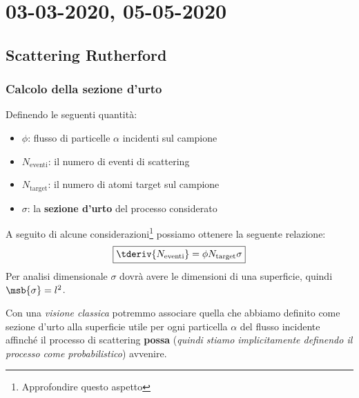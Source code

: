 \chapter{03-03-2020, 05-05-2020}
\section{Scattering Rutherford}
\subsection{Calcolo della sezione d'urto}
Definendo le seguenti quantità:
\begin{itemize}
  \item $\phi$: flusso di particelle $\alpha$ incidenti sul campione
  \item $N_{\text{eventi}}$: il numero di eventi di scattering
  \item $N_{\text{target}}$: il numero di atomi target sul campione
  \item $\sigma$: la \textbf{sezione d'urto} del processo considerato
\end{itemize}
A seguito di alcune considerazioni\footnote{Approfondire questo aspetto}
possiamo ottenere la seguente relazione:
\begin{equation}
  \boxed{\tderiv{N_{\text{eventi}}} = \phi N_{\text{target}} \sigma}
\end{equation}
Per analisi dimensionale $\sigma$ dovrà avere le dimensioni di una superficie,
quindi $\msb{\sigma} = l^2$.\par Con una \textit{visione classica} potremmo
associare quella che abbiamo definito come sezione d'urto alla superficie utile
per ogni particella $\alpha$ del flusso incidente affinché il processo di
scattering \textbf{possa} (\textit{quindi stiamo implicitamente definendo il
processo come probabilistico}) avvenire.

